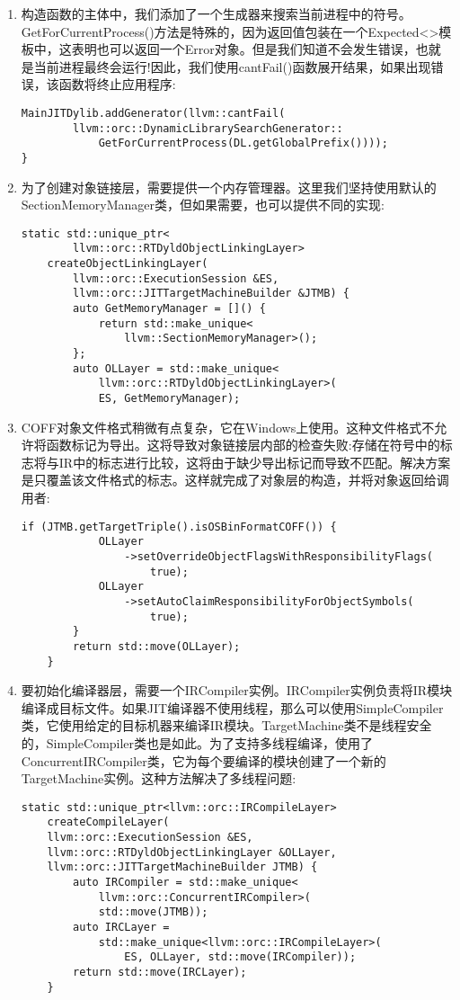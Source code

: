 \begin{enumerate}
\item 构造函数的主体中，我们添加了一个生成器来搜索当前进程中的符号。GetForCurrentProcess()方法是特殊的，因为返回值包装在一个Expected<>模板中，这表明也可以返回一个Error对象。但是我们知道不会发生错误，也就是当前进程最终会运行!因此，我们使用cantFail()函数展开结果，如果出现错误，该函数将终止应用程序:
\begin{lstlisting}[caption={}]
	MainJITDylib.addGenerator(llvm::cantFail(
		llvm::orc::DynamicLibrarySearchGenerator::
			GetForCurrentProcess(DL.getGlobalPrefix())));
}
\end{lstlisting}

\item 为了创建对象链接层，需要提供一个内存管理器。这里我们坚持使用默认的SectionMemoryManager类，但如果需要，也可以提供不同的实现:
\begin{lstlisting}[caption={}]
	static std::unique_ptr<
		llvm::orc::RTDyldObjectLinkingLayer>
	createObjectLinkingLayer(
		llvm::orc::ExecutionSession &ES,
		llvm::orc::JITTargetMachineBuilder &JTMB) {
		auto GetMemoryManager = []() {
			return std::make_unique<
				llvm::SectionMemoryManager>();
		};
		auto OLLayer = std::make_unique<
			llvm::orc::RTDyldObjectLinkingLayer>(
			ES, GetMemoryManager);
\end{lstlisting}

\item COFF对象文件格式稍微有点复杂，它在Windows上使用。这种文件格式不允许将函数标记为导出。这将导致对象链接层内部的检查失败:存储在符号中的标志将与IR中的标志进行比较，这将由于缺少导出标记而导致不匹配。解决方案是只覆盖该文件格式的标志。这样就完成了对象层的构造，并将对象返回给调用者:
\begin{lstlisting}[caption={}]
		if (JTMB.getTargetTriple().isOSBinFormatCOFF()) {
			OLLayer
				->setOverrideObjectFlagsWithResponsibilityFlags(
					true);
			OLLayer
				->setAutoClaimResponsibilityForObjectSymbols(
					true);
		}
		return std::move(OLLayer);
	}
\end{lstlisting}

\item 要初始化编译器层，需要一个IRCompiler实例。IRCompiler实例负责将IR模块编译成目标文件。如果JIT编译器不使用线程，那么可以使用SimpleCompiler类，它使用给定的目标机器来编译IR模块。TargetMachine类不是线程安全的，SimpleCompiler类也是如此。为了支持多线程编译，使用了ConcurrentIRCompiler类，它为每个要编译的模块创建了一个新的TargetMachine实例。这种方法解决了多线程问题:
\begin{lstlisting}[caption={}]
	static std::unique_ptr<llvm::orc::IRCompileLayer>
	createCompileLayer(
	llvm::orc::ExecutionSession &ES,
	llvm::orc::RTDyldObjectLinkingLayer &OLLayer,
	llvm::orc::JITTargetMachineBuilder JTMB) {
		auto IRCompiler = std::make_unique<
			llvm::orc::ConcurrentIRCompiler>(
			std::move(JTMB));
		auto IRCLayer =
			std::make_unique<llvm::orc::IRCompileLayer>(
				ES, OLLayer, std::move(IRCompiler));
		return std::move(IRCLayer);
	}
\end{lstlisting}


\end{enumerate}
